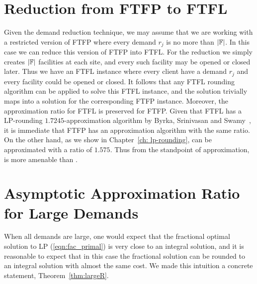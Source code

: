 \documentclass[oneside,final]{ucr}
\begin{document}
\section{Reduction from FTFP to FTFL}
\label{sec: reduction_to_ftfl}
Given the demand reduction technique, we may assume that we
are working with a restricted version of FTFP where every
demand $r_j$ is no more than $|\mathbb{F}|$. In this case we
can reduce this version of FTFP into FTFL. For the reduction
we simply creates $|\mathbb{F}|$ facilities at each site, and
every such facility may be opened or closed later. Thus we
have an FTFL instance where every client have a demand $r_j$
and every facility could be opened or closed. It follows
that any FTFL rounding algorithm can be applied to solve
this FTFL instance, and the solution trivially maps into a
solution for the corresponding FTFP instance. Moreover, the
approximation ratio for FTFL is preserved for FTFP. Given
that FTFL has a LP-rounding $1.7245$-approximation algorithm
by Byrka, Srinivasan and Swamy~\cite{ByrkaSS10}, it is
immediate that FTFP has an approximation algorithm with the
same ratio. On the other hand, as we show in
Chapter~\ref{ch: lp-rounding}, {\FTFP} can be approximated
with a ratio of $1.575$. Thus from the standpoint of
approximation, {\FTFP} is more amenable than {\FTFL}.

\section{Asymptotic Approximation Ratio for Large
  Demands}
\label{sec: large_demands}
When all demands are large, one would expect that the
fractional optimal solution to LP (\ref{eqn:fac_primal}) is
very close to an integral solution, and it is reasonable to
expect that in this case the fractional solution can be
rounded to an integral solution with almost the same
cost. We made this intuition a concrete statement,
Theorem~\ref{thm:largeR}.
\end{document}
